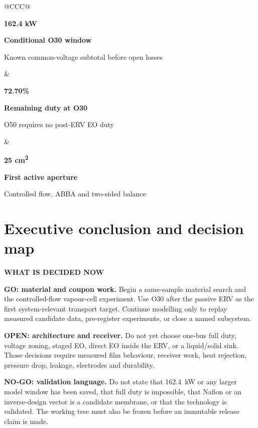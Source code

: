 \documentclass[10pt,a4paper]{article}
\newcommand{\sans}{\fontfamily{qhv}\selectfont}
\newcommand{\eyebrow}[1]{%
  {\sans\bfseries\color{Teal}\MakeUppercase{#1}}\par\vspace{1.5mm}%
}
\newcommand{\metric}[3]{%
  \begin{minipage}[t]{0.30\textwidth}
    {\sans\bfseries\fontsize{18}{20}\selectfont\color{Navy}#1}\par
    {\sans\bfseries\small #2}\par
    {\scriptsize\color{Slate}#3}
  \end{minipage}%
}
\begin{document}
\vspace{4mm}
\begin{tabularx}{\textwidth}{@{}CCC@{}}
\metric{162.4 kW}{Conditional O30 window}{Known common-voltage subtotal before open losses} &
\metric{72.70\%}{Remaining duty at O30}{O50 requires no post-ERV EO duty} &
\metric{25 cm\textsuperscript{2}}{First active aperture}{Controlled flow, ABBA and two-sided balance}
\end{tabularx}

\clearpage
\tableofcontents
\clearpage

\section{Executive conclusion and decision map}
\eyebrow{What is decided now}

\begin{gobox}
\textbf{GO: material and coupon work.} Begin a same-sample material search and
the controlled-flow vapour-cell experiment. Use O30 after the passive ERV as
the first system-relevant transport target. Continue modelling only to replay
measured candidate data, pre-register experiments, or close a named subsystem.
\end{gobox}

\begin{warningbox}
\textbf{OPEN: architecture and receiver.} Do not yet choose one-bus full duty,
voltage zoning, staged EO, direct EO inside the ERV, or a liquid/solid sink.
Those decisions require measured film behaviour, receiver work, heat
rejection, pressure drop, leakage, electrodes and durability.
\end{warningbox}

\begin{stopbox}
\textbf{NO-GO: validation language.} Do not state that 162.4~kW or any larger
model window has been saved, that full duty is impossible, that Nafion or an
inverse-design vector is a candidate membrane, or that the technology is
validated. The working tree must also be frozen before an immutable release
claim is made.
\end{stopbox}
\end{document}
